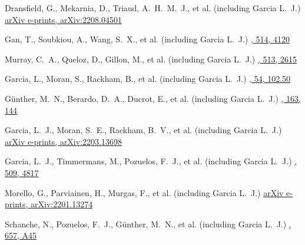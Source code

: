 {Dransfield, G., Mekarnia, D., Triaud, A.~H.~M.~J., et al. (including Garcia L.~J.)}
{\href{https://ui.adsabs.harvard.edu/abs/2022arXiv220804501D}{arXiv e-prints, arXiv:2208.04501}}

{Gan, T., Soubkiou, A., Wang, S.~X., et al. (including Garcia L.~J.)}
{\href{https://ui.adsabs.harvard.edu/abs/2022MNRAS.514.4120G}{\mnras, 514, 4120}}

{Murray, C.~A., Queloz, D., Gillon, M., et al. (including Garcia L.~J.)}
{\href{https://ui.adsabs.harvard.edu/abs/2022MNRAS.513.2615M}{\mnras, 513, 2615}}

{Garcia, L., Moran, S., Rackham, B., et al. (including Garcia L.~J.)}
{\href{https://ui.adsabs.harvard.edu/abs/2022BAAS...54e.050G}{\baas, 54, 102.50}}

{G{\"u}nther, M.~N., Berardo, D.~A., Ducrot, E., et al. (including Garcia L.~J.)}
{\href{https://ui.adsabs.harvard.edu/abs/2022AJ....163..144G}{\aj, 163, 144}}

{Garcia, L.~J., Moran, S.~E., Rackham, B.~V., et al. (including Garcia L.~J.)}
{\href{https://ui.adsabs.harvard.edu/abs/2022arXiv220313698G}{arXiv e-prints, arXiv:2203.13698}}

{Garcia, L.~J., Timmermans, M., Pozuelos, F.~J., et al. (including Garcia L.~J.)}
{\href{https://ui.adsabs.harvard.edu/abs/2022MNRAS.509.4817G}{\mnras, 509, 4817}}

{Morello, G., Parviainen, H., Murgas, F., et al. (including Garcia L.~J.)}
{\href{https://ui.adsabs.harvard.edu/abs/2022arXiv220113274M}{arXiv e-prints, arXiv:2201.13274}}

{Schanche, N., Pozuelos, F.~J., G{\"u}nther, M.~N., et al. (including Garcia L.~J.)}
{\href{https://ui.adsabs.harvard.edu/abs/2022A\&A...657A..45S}{\aap, 657, A45}}

